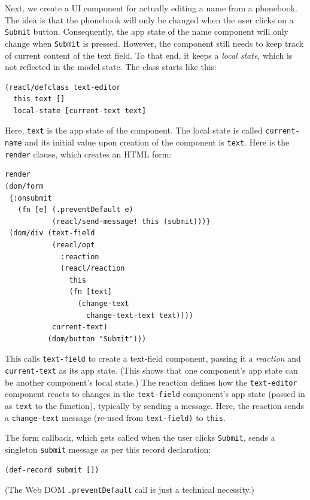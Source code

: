 \documentclass[sigplan,review,screen]{acmart}
\begin{document}
Next, we create a UI component for actually editing a name from a
phonebook.  The idea is that the phonebook will only be changed when
the user clicks on a \texttt{Submit} button.  Consequently, the app
state of the name component will only
change when \texttt{Submit} is pressed.  However, the component still
needs to keep track of current content of the text field.  To that
end, it keeps a \textit{local state}, which is not reflected in the
model state.  The class starts like this:
%
\begin{verbatim}
(reacl/defclass text-editor
  this text []
  local-state [current-text text]
\end{verbatim}
%
Here, \texttt{text} is the app state of the component.  The local
state is called \texttt{current-name} and its initial value upon
creation of the component is \texttt{text}.  Here is the
\texttt{render} clause, which creates an HTML form:
%
\begin{verbatim}
render
(dom/form
 {:onsubmit
   (fn [e] (.preventDefault e)
           (reacl/send-message! this (submit)))}
 (dom/div (text-field
           (reacl/opt
             :reaction
             (reacl/reaction
               this
               (fn [text]
                 (change-text
                   change-text-text text))))
           current-text)
          (dom/button "Submit")))
\end{verbatim}
%
This calls \texttt{text-field} to create a text-field component,
passing it a \textit{reaction} and \texttt{current-text} as its app
state.  (This shows that one component's app state can be another
component's local state.)  The reaction defines how the
\texttt{text-editor} component reacts to changes in the
\texttt{text-field} component's app state (passed in as \texttt{text}
to the function), typically by sending a message.  Here, the reaction
sends a \texttt{change-text} message (re-used from
\texttt{text-field)} to \texttt{this}.

The form callback, which gets called when the user clicks
\texttt{Submit}, sends a singleton \texttt{submit} message as per this
record declaration:
%
\begin{verbatim}
(def-record submit [])
\end{verbatim}
%
(The Web DOM \texttt{.preventDefault} call is just a technical necessity.)
\end{document}
